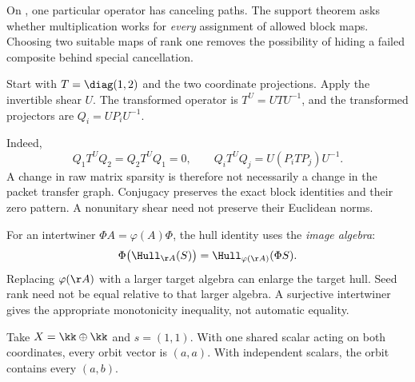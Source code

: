 On , one particular operator has canceling paths. The support theorem asks whether multiplication works for \emph{every} assignment of allowed block maps. Choosing two suitable maps of rank one removes the possibility of hiding a failed composite behind special cancellation.


Start with $T=\diag(1,2)$ and the two coordinate projections. Apply the invertible shear $U$. The transformed operator is $T^U=UTU^{-1}$, and the transformed projectors are $Q_i=UP_iU^{-1}$.


Indeed,
\[
Q_1T^UQ_2=Q_2T^UQ_1=0,
\qquad
Q_iT^UQ_j=U(P_iTP_j)U^{-1}.
\]
A change in raw matrix sparsity is therefore not necessarily a change in the packet transfer graph. Conjugacy preserves the exact block identities and their zero pattern. A nonunitary shear need not preserve their Euclidean norms.

For an intertwiner $\Phi A=\varphi(A)\Phi$, the hull identity uses the \emph{image algebra}:
\[
\Phi\bigl(\Hull_{\AA}(S)\bigr)=\Hull_{\varphi(\AA)}(\Phi S).
\]
Replacing $\varphi(\AA)$ with a larger target algebra can enlarge the target hull. Seed rank need not be equal relative to that larger algebra. A surjective intertwiner gives the appropriate monotonicity inequality, not automatic equality.


Take $X=\kk\oplus\kk$ and $s=(1,1)$. With one shared scalar acting on both coordinates, every orbit vector is $(a,a)$. With independent scalars, the orbit contains every $(a,b)$.

